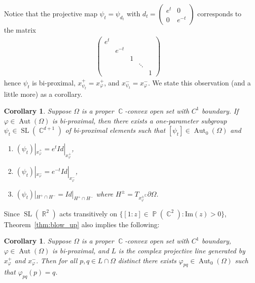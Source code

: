 \documentclass[12pt]{amsart}
\theoremstyle{plain}
\newtheorem{corollary}[proposition]{Corollary}
\theoremstyle{definition}
\theoremstyle{remark}
\begin{document}
Notice that the projective map $\psi_t=\psi_{d_t}$ with $d_t = \begin{pmatrix} e^{t} & 0 \\ 0 & e^{-t} \end{pmatrix}$ corresponds to the matrix
\begin{align*}
\begin{pmatrix}
e^{t} & & & & \\
& e^{-t} & & & \\
& & 1 &  & \\
& & & \ddots & \\
& & & & 1 
\end{pmatrix}
\end{align*}
hence $\psi_t$ is bi-proximal, $x^+_{\psi_t} = x^+_{\varphi}$, and $x^-_{\psi_t}=x^-_{\varphi}$. We state this observation (and a little more) as a corollary.

\begin{corollary}
\label{cor:special_bi}
Suppose $\Omega$ is a proper $\operatorname{\mathbb{C}}$-convex open set with $C^1$ boundary. If $\varphi \in \operatorname{Aut}(\Omega)$ is bi-proximal, then there exists a one-parameter subgroup $\psi_t \in \operatorname{SL}(\operatorname{\mathbb{C}}^{d+1})$ of bi-proximal elements such that $[\psi_t] \in \operatorname{Aut}_0(\Omega)$ and
\begin{enumerate}
\item $(\psi_t)|_{x^+_{\varphi}} = e^tId|_{x^+_{\varphi}} $,
\item $(\psi_t)|_{x^-_{\varphi}} = e^{-t}Id|_{x^-_{\varphi}} $,
\item $(\psi_t)|_{H^+ \cap H^-} = Id|_{H^+ \cap H^-}$ where $H^{\pm} = T_{x^\pm_{\varphi}}^\operatorname{\mathbb{C}} \partial \Omega$.
\end{enumerate}
\end{corollary}

Since $\operatorname{SL}(\operatorname{\mathbb{R}}^2)$ acts transitively on $\{ [1:z] \in \operatorname{\mathbb{P}}(\operatorname{\mathbb{C}}^2) : \mathrm{Im}(z) >0\}$, Theorem~\ref{thm:blow_up} also implies the following:

\begin{corollary}
\label{cor:bi_2}
Suppose $\Omega$ is a proper $\operatorname{\mathbb{C}}$-convex open set with $C^1$ boundary, $\varphi \in \operatorname{Aut}(\Omega)$ is bi-proximal, and $L$ is the complex projective line generated by $x^+_{\varphi }$ and $x^-_{\varphi }$. Then for all $p,q \in L \cap \Omega$ distinct there exists $\varphi_{pq} \in \operatorname{Aut}_0(\Omega)$ such that $\varphi_{pq}(p)=q$. 
\end{corollary}
\end{document}
